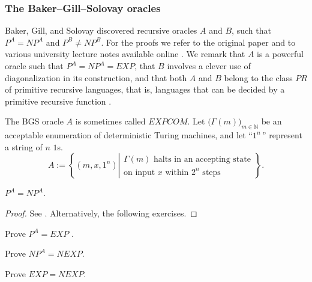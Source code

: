 \documentclass[letterpaper]{article}
\begin{document}
\subsubsection{The Baker--Gill--Solovay oracles}\label{bgs}
Baker, Gill, and Solovay  discovered recursive oracles $A$ and $B$, such that $P^A=NP^A$ and $P^B\ne NP^B$.  For the proofs we refer to the original paper \cite{baker1975relativizations} and to various university lecture notes available online \cite{spielman2001adv, feigenbaum2010bgs,holenstein2010complex,moshkovitz2012rel}. We remark that $A$ is a powerful oracle such that $P^A=NP^A=EXP$, that $B$ involves a clever use of diagonalization in its construction, and that both $A$ and $B$ belong to the class $PR$ of primitive recursive languages, that is, languages that can be decided by a primitive recursive function \cite{robinson1950general}.
\begin{definition}\label{bgsa}
The BGS oracle $A$ is sometimes called $EXPCOM$. Let $\big(\Gamma(m)\big)_{m\in\mathbb N}$ be an acceptable enumeration of deterministic Turing machines, and let ``$1^n\,$'' represent a string of $n$ $1$s.
\begin{equation}
A:=\left\{(m,x,1^n)\left|\begin{array}{l}
\Gamma(m) \textrm{ halts in an accepting state} \\ \textrm{on input } x \textrm{ within } 2^n \textrm{ steps}
\end{array}\right.\right\}.
\end{equation}
\end{definition}
\begin{theorem}
	$P^A=NP^A$.
\end{theorem}
\begin{proof}
See \cite{baker1975relativizations,spielman2001adv, feigenbaum2010bgs,holenstein2010complex,moshkovitz2012rel}.  Alternatively, the following exercises.
\end{proof}

\begin{exercise}
	Prove $P^A=EXP$ \cite{volleyball-icon}.
\end{exercise}
\begin{exercise}
Prove $NP^A=NEXP$.
\end{exercise}
\begin{exercise}
Prove $EXP=NEXP$.
\end{exercise}
\end{document}
